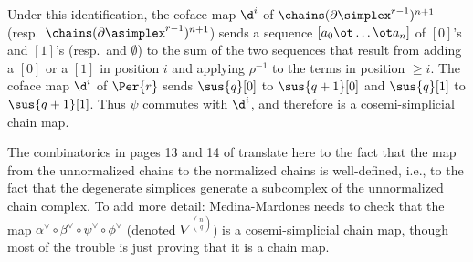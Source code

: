 Under this identification, the coface map $\d^i$ of $\chains(\partial\simplex^{r-1})^{n+1}$ (resp.\ $\chains(\partial\asimplex^{r-1})^{n+1}$) sends a sequence $[a_0\ot \ldots\ot a_n]$ of $[0]$'s and $[1]$'s (resp.\ and $\emptyset$) to the sum of the two sequences that result from adding a $[0]$ or a $[1]$ in position $i$ and applying $\rho^{-1}$ to the terms in position $\geq i$. The coface map $\d^i$ of $\Per{r}$ sends $\sus{q}[0]$ to $\sus{q+1}[0]$ and $\sus{q}[1]$ to $\sus{q+1}[1]$. Thus $\psi$ commutes with $\d^i$, and therefore is a cosemi-simplicial chain map.
\begin{remark}
	The combinatorics in pages 13 and 14  of \cite{medina2021fast_sq} translate here to the fact that the map from the unnormalized chains to the normalized chains is well-defined, i.e., to the fact that the degenerate simplices generate a subcomplex of the unnormalized chain complex. To add more detail: Medina-Mardones needs to check that the map $\alpha^\vee\circ \beta^{\vee}\circ \psi^\vee\circ \phi^\vee$ (denoted $\nabla^{\binom{n}{q}}$) is a cosemi-simplicial chain map, though most of the trouble is just proving that it is a chain map.
	

\end{remark}
